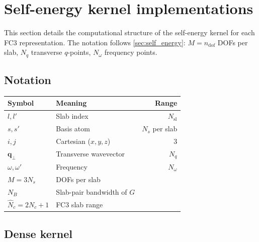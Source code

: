 \documentclass[11pt]{article}
\newcommand{\vc}[1]{\bm{#1}}
\newcommand{\ndof}{n_{\mathrm{dof}}}
\newcommand{\vq}{\vc{q}}
\begin{document}
%
%

\section{Self-energy kernel implementations}
\label{sec:kernels}

This section details the computational structure of the self-energy
kernel for each FC3 representation.  The notation follows
\cref{sec:self_energy}: $M = \ndof$ DOFs per slab, $N_q$ transverse
$q$-points, $N_\omega$ frequency points.

\subsection{Notation}
\label{sec:kernel_notation}

\begin{center}
\begin{tabular}{llr}
  \toprule
  Symbol & Meaning & Range \\
  \midrule
  $l,l'$                & Slab index          & $N_\mathrm{sl}$ \\
  $s,s'$                & Basis atom          & $N_s$ per slab \\
  $i,j$                 & Cartesian ($x,y,z$) & 3 \\
  $\vq_\perp$           & Transverse wavevector & $N_q$ \\
  $\omega,\omega'$      & Frequency           & $N_\omega$ \\
  $M = 3N_s$            & DOFs per slab       & \\
  $N_B$                 & Slab-pair bandwidth of $G$ & \\
  $\hat{N}_c = 2N_c+1$  & FC3 slab range      & \\
  \bottomrule
\end{tabular}
\end{center}

\subsection{Dense kernel}
\label{sec:dense_kernel}
\end{document}
